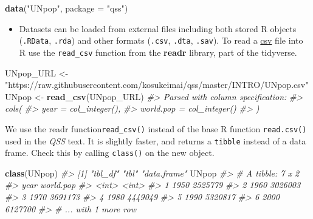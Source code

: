 \documentclass[]{book}
\newenvironment{Shaded}{\begin{snugshade}}{\end{snugshade}}
\newcommand{\CommentTok}[1]{\textcolor[rgb]{0.56,0.35,0.01}{\textit{#1}}}
\newcommand{\DataTypeTok}[1]{\textcolor[rgb]{0.13,0.29,0.53}{#1}}
\newcommand{\KeywordTok}[1]{\textcolor[rgb]{0.13,0.29,0.53}{\textbf{#1}}}
\newcommand{\NormalTok}[1]{#1}
\newcommand{\StringTok}[1]{\textcolor[rgb]{0.31,0.60,0.02}{#1}}
\providecommand{\tightlist}{%
  \setlength{\itemsep}{0pt}\setlength{\parskip}{0pt}}
\theoremstyle{definition}
\theoremstyle{definition}
\theoremstyle{definition}
\theoremstyle{remark}
\begin{document}
\begin{Shaded}
\begin{Highlighting}[]
\KeywordTok{data}\NormalTok{(}\StringTok{"UNpop"}\NormalTok{, }\DataTypeTok{package =} \StringTok{"qss"}\NormalTok{)}
\end{Highlighting}
\end{Shaded}

\begin{itemize}
\tightlist
\item
  Datasets can be loaded from external files including both stored R
  objects (\texttt{.RData}, \texttt{.rda}) and other formats
  (\texttt{.csv}, \texttt{.dta}, \texttt{.sav}). To read a
  \href{https://en.wikipedia.org/wiki/Comma-separated_values}{csv} file
  into R use the \texttt{read\_csv} function from the \textbf{readr}
  library, part of the tidyverse.
\end{itemize}

\begin{Shaded}
\begin{Highlighting}[]
\NormalTok{UNpop_URL <-}\StringTok{ "https://raw.githubusercontent.com/kosukeimai/qss/master/INTRO/UNpop.csv"}
\NormalTok{UNpop <-}\StringTok{ }\KeywordTok{read_csv}\NormalTok{(UNpop_URL)}
\CommentTok{#> Parsed with column specification:}
\CommentTok{#> cols(}
\CommentTok{#>   year = col_integer(),}
\CommentTok{#>   world.pop = col_integer()}
\CommentTok{#> )}
\end{Highlighting}
\end{Shaded}

We use the readr function\texttt{read\_csv()} instead of the base R
function \texttt{read.csv()} used in the \emph{QSS} text. It is slightly
faster, and returns a \texttt{tibble} instead of a data frame. Check
this by calling \texttt{class()} on the new object.

\begin{Shaded}
\begin{Highlighting}[]
\KeywordTok{class}\NormalTok{(UNpop)}
\CommentTok{#> [1] "tbl_df"     "tbl"        "data.frame"}
\NormalTok{UNpop}
\CommentTok{#> # A tibble: 7 x 2}
\CommentTok{#>    year world.pop}
\CommentTok{#>   <int>     <int>}
\CommentTok{#> 1  1950   2525779}
\CommentTok{#> 2  1960   3026003}
\CommentTok{#> 3  1970   3691173}
\CommentTok{#> 4  1980   4449049}
\CommentTok{#> 5  1990   5320817}
\CommentTok{#> 6  2000   6127700}
\CommentTok{#> # ... with 1 more row}
\end{Highlighting}
\end{Shaded}
\end{document}
